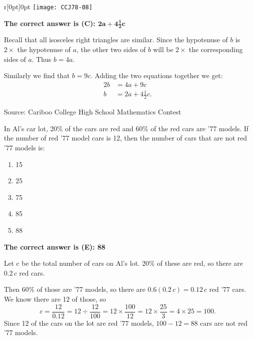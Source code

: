 \documentclass{article}
\begin{document}
\begin{wrapfigure}[5]{r}[0pt]{0pt}
	\texttt{[image: CCJ78-08]}
\end{wrapfigure}
\textbf{The correct answer is (C): $\mathbf{2a+4\frac{1}{2}c}$}

Recall that all isosceles right triangles are similar. Since the hypotenuse of $b$ is $2\times$ the hypotenuse of $a$, the other two sides of $b$ will be $2\times$ the corresponding sides of $a$. Thus $b=4a$.

Similarly we find that $b=9c$. Adding the two equations together we get:
\begin{align*}
2b&=4a+9c\\
b&=2a+4\tfrac{1}{2}c.
\end{align*}

\vskip 1.5cm


\scriptsize
Source: Cariboo College High School Mathematics Contest

\normalsize
In Al's car lot, 20\% of the cars are red and 60\% of the red cars are '77 models. If the number of red '77 model cars is 12, then the number of cars that are not red '77 models is:
\begin{enumerate}[noitemsep,topsep=0mm,leftmargin=*,widest=D,label=\Alph*)]
	\item 15
	\item 25
	\item 75
	\item 85
	\item 88
\end{enumerate}

\textbf{The correct answer is (E): 88}

Let c be the total number of cars on Al's lot. 20\% of these are red, so there are $0.2\,c$ red cars.

Then 60\% of those are '77 models, so there are $0.6(0.2\,c) = 0.12\,c$ red '77 cars. We know there are 12 of those, so
\[
c = \frac{12}{0.12} = 12 \div \frac{12}{100} = 12 \times \frac{100}{12} = 12 \times \frac{25}{3} = 4 \times 25 = 100.
\]
Since 12 of the cars on the lot are red '77 models, $100-12=88$ cars are not red '77 models.

\vskip 1.5cm
\end{document}
